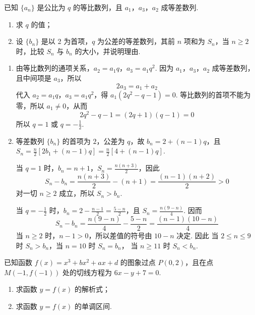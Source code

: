 \begin{problem}
已知 \(\{a_{n}\}\) 是公比为 \(q\) 的等比数列，且 \(a_{1}\)，\(a_{3}\)，\(a_{2}\) 成等差数列.

\begin{enumerate}
\item 求 \(q\) 的值；
\item 设 \(\{b_n\}\) 是以 2 为首项，\(q\) 为公差的等差数列，其前 \(n\) 项和为 \(S_n\)，当 \(n \geqslant 2\) 时，比较 \(S_n\) 与 \(b_n\) 的大小，并说明理由.
\end{enumerate}
\end{problem}

\begin{solution}
\begin{enumerate}
\item 由等比数列的通项关系，\(a_2=a_1q\)，\(a_3=a_1q^2\). 因为 \(a_1\)，\(a_3\)，\(a_2\)
成等差数列，且中间项是 \(a_3\)，所以
\[
2a_3=a_1+a_2
\]
代入 \(a_2=a_1q\)，\(a_3=a_1q^2\)，得
\(a_1(2q^2-q-1)=0\). 等比数列的首项不能为零，所以 \(a_1\ne0\)，从而
\[
2q^2-q-1=(2q+1)(q-1)=0
\]
所以 \(q=1\) 或 \(q=-\frac{1}{2}\).
\item 等差数列 \(\{b_n\}\) 的首项为 \(2\)，公差为 \(q\)，故
\(b_n=2+(n-1)q\)，且
\(S_n=\frac{n}{2}\left[2b_1+(n-1)q\right]
=\frac{n}{2}\left[4+(n-1)q\right]\).

当 \(q=1\) 时，\(b_n=n+1\)，\(S_n=\frac{n(n+3)}{2}\)，因此
\[
S_n-b_n=\frac{n(n+3)}{2}-(n+1)=\frac{(n-1)(n+2)}{2}>0
\]
对一切 \(n\geqslant2\) 成立，所以 \(S_n>b_n\).

当 \(q=-\frac{1}{2}\) 时，\(b_n=2-\frac{n-1}{2}=\frac{5-n}{2}\)，且
\(S_n=\frac{n(9-n)}{4}\). 因而
\[
S_n-b_n=\frac{n(9-n)}{4}-\frac{5-n}{2}
=\frac{(n-1)(10-n)}{4}
\]
当 \(n\geqslant2\) 时，\(n-1>0\)，所以差值的符号由 \(10-n\) 决定. 因此
当 \(2\leqslant n\leqslant9\) 时 \(S_n>b_n\)，当 \(n=10\) 时 \(S_n=b_n\)，
当 \(n\geqslant11\) 时 \(S_n<b_n\).
\end{enumerate}
\end{solution}

\begin{problem}
已知函数 \( f(x) = x^3 + bx^2 + ax + d \) 的图象过点 \( P(0,2) \)，且在点 \( M(-1, f(-1)) \) 处的切线方程为 \( 6x - y + 7 = 0 \).

\begin{enumerate}
\item 求函数 \( y = f(x) \) 的解析式；
\item 求函数 \( y = f(x) \) 的单调区间.
\end{enumerate}
\end{problem}

